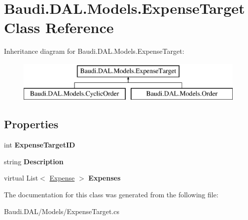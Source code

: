 \hypertarget{class_baudi_1_1_d_a_l_1_1_models_1_1_expense_target}{}\section{Baudi.\+D\+A\+L.\+Models.\+Expense\+Target Class Reference}
\label{class_baudi_1_1_d_a_l_1_1_models_1_1_expense_target}
Inheritance diagram for Baudi.\+D\+A\+L.\+Models.\+Expense\+Target\+:\begin{figure}[H]
\begin{center}
\leavevmode
\includegraphics[height=2.000000cm]{class_baudi_1_1_d_a_l_1_1_models_1_1_expense_target}
\end{center}
\end{figure}
\subsection*{Properties}
\begin{DoxyCompactItemize}
\item 
\hypertarget{class_baudi_1_1_d_a_l_1_1_models_1_1_expense_target_af0b77aa8b2c9c1b4c47bf3c7ec3066ac}{}int {\bfseries Expense\+Target\+I\+D}\label{class_baudi_1_1_d_a_l_1_1_models_1_1_expense_target_af0b77aa8b2c9c1b4c47bf3c7ec3066ac}

\item 
\hypertarget{class_baudi_1_1_d_a_l_1_1_models_1_1_expense_target_aff62297dae9e80eeadd413fc807ec7e3}{}string {\bfseries Description}\label{class_baudi_1_1_d_a_l_1_1_models_1_1_expense_target_aff62297dae9e80eeadd413fc807ec7e3}

\item 
\hypertarget{class_baudi_1_1_d_a_l_1_1_models_1_1_expense_target_a36e63ab20e49719ea86ea51b9aadb927}{}virtual List$<$ \hyperlink{class_baudi_1_1_d_a_l_1_1_models_1_1_expense}{Expense} $>$ {\bfseries Expenses}\label{class_baudi_1_1_d_a_l_1_1_models_1_1_expense_target_a36e63ab20e49719ea86ea51b9aadb927}

\end{DoxyCompactItemize}


The documentation for this class was generated from the following file\+:\begin{DoxyCompactItemize}
\item 
Baudi.\+D\+A\+L/\+Models/Expense\+Target.\+cs\end{DoxyCompactItemize}

